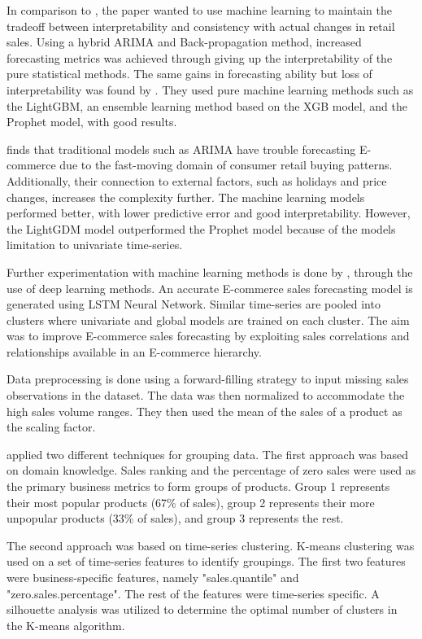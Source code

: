 In comparison to \cite{Weng2020}, the paper \cite{Bowen2020} wanted to use machine learning to maintain
the tradeoff between interpretability and consistency with actual
changes in retail sales.
Using a hybrid ARIMA and Back-propagation method, increased forecasting metrics was achieved through
giving up the interpretability of the pure statistical methods.
The same gains in forecasting ability but loss of interpretability was
found by \cite{Zunic2020}.
They used pure machine learning methods such as the LightGBM, an ensemble learning method based on the XGB model,
and the Prophet model, with good results.

\cite{Bowen2020} finds that traditional models such as ARIMA have trouble forecasting E-commerce
due to the fast-moving domain of consumer retail buying patterns.
Additionally, their connection to external factors,
such as holidays and price changes, increases the complexity further.
The machine learning models performed better, with lower predictive error
and good interpretability.
However, the LightGDM model outperformed the Prophet model because of the
models limitation to univariate time-series.


Further experimentation with machine learning methods is done by \cite{Bandara2019},
through the use of deep learning methods.
An accurate E-commerce sales forecasting model is generated using LSTM  Neural Network.
Similar time-series are pooled into clusters where univariate and global models are trained on each cluster.
The aim was to improve E-commerce sales forecasting by exploiting sales correlations and relationships
available in an E-commerce hierarchy.

Data preprocessing is done using a forward-filling strategy to input missing sales
observations in the dataset.
The data was then normalized to accommodate the high sales volume ranges.
They then used the mean of the sales of a product as the scaling factor.

\cite{Bandara2019} applied two different techniques for grouping data.
The first approach was based on domain knowledge.
Sales ranking and the percentage of zero sales were used as the primary business metrics
to form groups of products.
Group 1 represents their most popular products (67\% of sales), group 2 represents
their more unpopular products (33\% of sales), and group 3 represents the rest.

The second approach was based on time-series clustering.
K-means clustering was used on a set of time-series features to identify groupings.
The first two features were business-specific features, namely "sales.quantile" and "zero.sales.percentage".
The rest of the features were time-series specific.
A silhouette analysis was utilized to determine the optimal number of clusters in the K-means algorithm.

